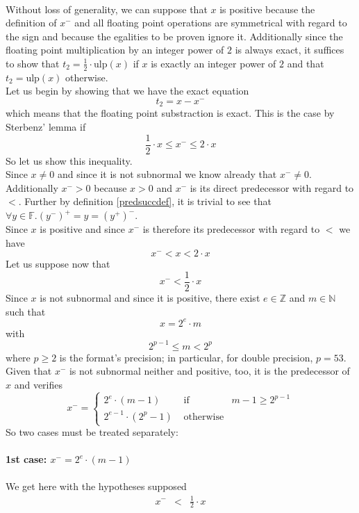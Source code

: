 \documentclass[a4paper,10pt,twoside]{article}
\newenvironment{proof}[1][Proof]{\begin{trivlist}
\item[\hskip \labelsep {\bfseries #1}]}{\end{trivlist}}
\newcommand{\N}{\ensuremath{\mathbb {N}}}
\newcommand{\Z}{\ensuremath{\mathbb {Z}}}
\newcommand{\F}{\ensuremath{\mathbb {F}}}
\newcommand{\mUlp}{\ensuremath{\mathrm{ulp}}}
\begin{document}
\begin{proof} ~\\
Without loss of generality, we can suppose that $x$ is positive because the definition of $x^-$ and all floating
point operations are symmetrical with regard to the sign \cite{IEEE754} and because the egalities to be proven ignore it.
Additionally since the floating point multiplication by an integer power of $2$ is always exact, it suffices to 
show that $t_2 = \frac{1}{2} \cdot \mUlp \left( x \right)$ if $x$ is exactly an integer power of $2$ and that
$t_2 = \mUlp\left( x \right)$ otherwise.\\
Let us begin by showing that we have the exact equation 
$$t_2 = x - x^-$$
which means that the floating point substraction is exact. This is the case by Sterbenz' lemma \cite{Ste74} if 
$$\frac{1}{2} \cdot x \leq x^- \leq 2 \cdot x$$
So let us show this inequality. \\
Since $x \not = 0$ and since it is not subnormal we know already that $x^- \not = 0$. 
Additionally $x^- > 0$ because $x > 0$ and $x^-$ is its direct predecessor with regard to $<$.
Further by definition \ref{predsuccdef}, it is trivial to see that 
$\forall y \in \F.\left( y^- \right)^+ = y = \left( y^+ \right)^-$.\\
Since $x$ is positive and since $x^-$ is therefore its predecessor with regard to $<$ we have
$$x^- < x < 2 \cdot x$$
Let us suppose now that 
$$x^- < \frac{1}{2} \cdot x$$
Since $x$ is not subnormal and since it is positive, there exist $e \in \Z$ and  $m \in \N$ such that
$$x = 2^e \cdot m$$
with
$$2^{p-1} \leq m < 2^p$$ 
where $p \geq 2$ is the format's precision; in particular, for double precision, $p=53$.\\
Given that $x^-$ is not subnormal neither and positive, too, it is the predecessor of $x$ and verifies
$$x^- = \left \lbrace \begin{array}{lll} 2^e \cdot \left(m - 1 \right) & \mbox{ if } & m-1 \geq 2^{p-1} \\
                                             2^{e-1} \cdot \left( 2^p - 1 \right) & \mbox{ otherwise} & \end{array} \right.$$
So two cases must be treated separately:\\~\\
{\bf 1st case: $x^- = 2^e \cdot  \left( m -1 \right)$ } \\ ~ \\
We get here with the hypotheses supposed 
\begin{eqnarray*}
x^- & < & \frac{1}{2} \cdot x \\

\end{eqnarray*}
\end{proof}
\end{document}
